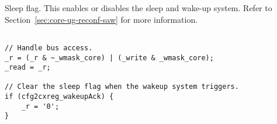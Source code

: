 Sleep flag. This enables or disables the sleep and wake-up system. Refer to
Section~\ref{sec:core-ug-reconf-saw} for more information.

\declaration{}
\implementation{}
\begin{lstlisting}

// Handle bus access.
_r = (_r & ~_wmask_core) | (_write & _wmask_core);
_read = _r;

// Clear the sleep flag when the wakeup system triggers.
if (cfg2cxreg_wakeupAck) {
    _r = '0';
}

\end{lstlisting}
